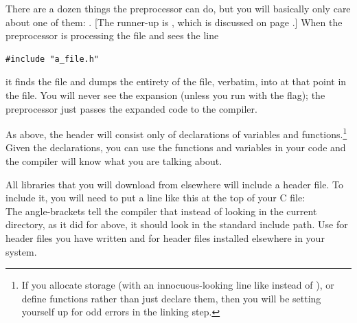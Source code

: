 \documentclass[12pt]{article}
\makeatletter
\def\cind#1{\index{#1@\ci{#1}}\ci{#1}}
\makeatother
\begin{document}
There are a dozen things the preprocessor can do, but you will basically only care about one of them: \cind{\#include}. 
[The runner-up is , which is discussed on page \pageref{macros}.] 
When the preprocessor is processing the file  and sees
the line
\begin{lstlisting}
#include "a_file.h"
\end{lstlisting}
it finds the file  and dumps the entirety of the file,
verbatim, into  at that point in the file. You will never
see the expansion (unless you run  with the 
flag); the preprocessor just passes the expanded code to the compiler.

As above, the header will consist only of declarations of variables
and functions.\footnote{If you allocate storage (with an innocuous-looking
line like  instead of ), or define
functions rather than just declare them, then you will be setting
yourself up for odd errors in the linking step.} Given the declarations,
you can use the functions and variables in your code and the compiler
will know what you are talking about.

All libraries that you will download from elsewhere will include a header file.
To include it, you will need to put a line like this at the top of your C file:
\\
The angle-brackets tell the compiler that instead of looking in the
current directory, as it did for  above, it should
look in the standard include path. Use  for header
files you have written and  for header files
installed elsewhere in your system.  
\end{document}
